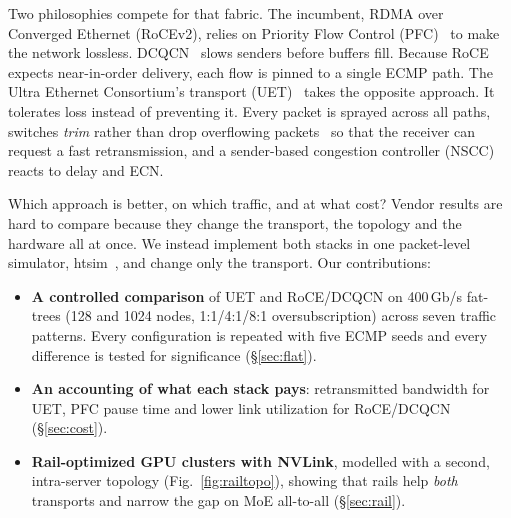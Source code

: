 \documentclass[conference]{IEEEtran}
\begin{document}
Two philosophies compete for that fabric. The incumbent, RDMA over Converged
Ethernet (RoCEv2), relies on Priority Flow Control (PFC)~\cite{pfc} to make the
network lossless. DCQCN~\cite{dcqcn} slows senders before buffers fill. Because
RoCE expects near-in-order delivery, each flow is pinned to a single ECMP path.
The Ultra Ethernet Consortium's transport (UET)~\cite{uec-spec,uec-design}
takes the opposite approach. It tolerates loss instead of preventing it. Every
packet is sprayed across all paths, switches \emph{trim} rather than drop
overflowing packets~\cite{ndp} so that the receiver can request a fast
retransmission, and a sender-based congestion controller (NSCC) reacts to delay
and ECN.

Which approach is better, on which traffic, and at what cost? Vendor results
are hard to compare because they change the transport, the topology and the
hardware all at once. We instead implement both stacks in one packet-level
simulator, htsim~\cite{ndp}, and change only the transport. Our contributions:

\begin{itemize}
  \item \textbf{A controlled comparison} of UET and RoCE/DCQCN on 400\,Gb/s
        fat-trees (128 and 1024 nodes, 1:1/4:1/8:1 oversubscription) across
        seven traffic patterns. Every configuration is repeated with five ECMP
        seeds and every difference is tested for significance (\S\ref{sec:flat}).
  \item \textbf{An accounting of what each stack pays}: retransmitted bandwidth
        for UET, PFC pause time and lower link utilization for
        RoCE/DCQCN (\S\ref{sec:cost}).
  \item \textbf{Rail-optimized GPU clusters with NVLink}, modelled with a
        second, intra-server topology (Fig.~\ref{fig:railtopo}), showing that
        rails help \emph{both} transports and narrow the gap on MoE all-to-all
        (\S\ref{sec:rail}).

\end{itemize}

\end{document}
